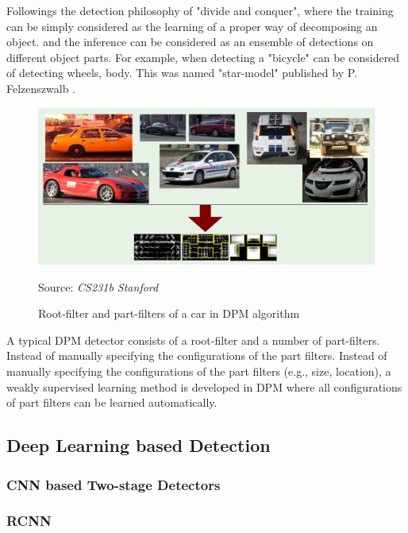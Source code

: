 \documentclass[12pt]{article}
\newcommand{\source}[1]{\caption*{Source: \emph{#1}} }
\begin{document}
Followings the detection philosophy of "divide and conquer", where the training can 
be simply considered as the learning of a proper way of decomposing an object. 
and the inference can be considered as an ensemble of detections on different object 
parts. For example, when detecting a "bicycle" can be considered of detecting wheels, 
body. This was named "star-model" published by P. Felzenszwalb \cite{felzenszwalb2008discriminatively}.

\begin{figure}[htp]
    \centering
    \includegraphics[width=1\textwidth]{images/dpm.png}
    \caption{Root-filter and part-filters of a car in DPM algorithm}
    \label{fig:dpm}
    \source{CS231b Stanford}
\end{figure}

A typical DPM detector consists of a root-filter and a number of part-filters. Instead 
of manually specifying the configurations of the part filters. Instead of manually 
specifying the configurations of the part filters (e.g., size, location), a weakly supervised 
learning method is developed in DPM where all configurations of part filters can be 
learned automatically.



\subsection{Deep Learning based Detection}
\label{sec:deep_learning}

\subsubsection{CNN based Two-stage Detectors}
\label{sec:two_stage}

\subsubsection*{RCNN}
\end{document}
